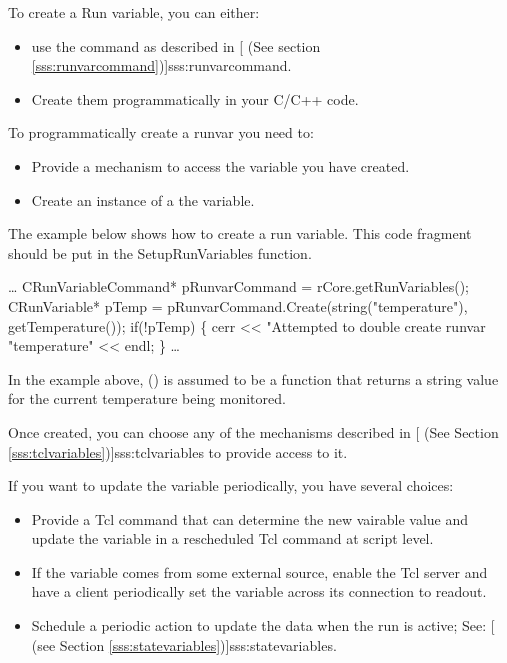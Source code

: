       
      To create a Run variable, you can either:
      \begin{itemize}
         \item use the  command as described in 
            [
            (See section \ref{sss:runvarcommand})]{sss:runvarcommand}.
         \item Create them programmatically in your C/C++ code.
      \end{itemize}
      
      To programmatically create a runvar you need to:
      \begin{itemize}
         \item Provide a mechanism to access the variable you have created.
         \item Create an instance of a the variable.
      \end{itemize}

        The example below shows how to create a run variable.  This code 
         fragment should be put in the SetupRunVariables function.
         
         \begin{example}
            \ldots
            CRunVariableCommand* pRunvarCommand = 
                  rCore.getRunVariables();
            CRunVariable* pTemp = 
                  pRunvarCommand.Create(string("temperature"),
                                                     getTemperature());
            if(!pTemp) \{
               cerr << "Attempted to double create runvar "temperature"
                     << endl;
            \}
            \ldots
         \end{example}

         In the example above, () is assumed
         to be a function that returns a string value for the current 
         temperature being monitored.
         
         Once created, you can choose any of the mechanisms described
         in   
      	 [
	    (See Section \ref{sss:tclvariables})]{sss:tclvariables} 
         to provide access to it.
         
         If you want to update the variable periodically, you have several
         choices:
         \begin{itemize}
            \item Provide a Tcl command that can determine the new vairable
                  value and update the variable in a rescheduled 
                  Tcl command at script level.
            \item If the variable comes from some external source, enable the
               Tcl server and have a client periodically set the variable across
               its connection to readout.
            \item Schedule a periodic action to update the data when the
               run is active; See:
               [
                  (see Section \ref{sss:statevariables})]{sss:statevariables}.
         \end{itemize}
      
